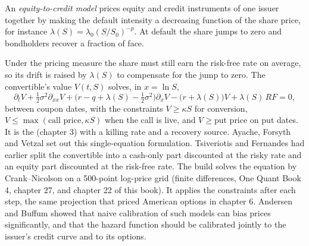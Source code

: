 \begin{definition}\label{def:dv:convertibles-and-the-credit-equity-link:e2c}
An \emph{equity-to-credit model} prices equity and credit instruments of one issuer together by making the
default intensity a decreasing function of the share price, for instance $\lambda(S)=\lambda_0(S/S_0)^{-p}$. At default the share
jumps to zero and bondholders recover a fraction of face.
\end{definition}

Under the pricing measure the share must still earn the risk-free rate on average, so its drift is raised by $\lambda(S)$ to compensate
for the jump to zero. The convertible's value $V(t,S)$ solves, in $x=\ln S$,
\[
\partial_tV+\tfrac12\sigma^2\partial_{xx}V+\bigl(r-q+\lambda(S)-\tfrac12\sigma^2\bigr)\partial_xV-\bigl(r+\lambda(S)\bigr)V+\lambda(S)\,RF=0,
\]
between coupon dates, with the constraints $V\ge\kappa S$ for conversion, $V\le\max(\text{call price},\kappa S)$ when the call is live, and
$V\ge\text{put price}$ on put dates. It is the  (chapter 3) with a killing rate and a recovery source. Ayache, Forsyth
and Vetzal set out this single-equation formulation. Tsiveriotis and Fernandes had earlier split the convertible into a cash-only part
discounted at the risky rate and an equity part discounted at the risk-free rate. The build solves the equation by Crank--Nicolson on a
500-point log-price grid (finite differences, One Quant Book 4, chapter 27, and chapter 22 of this book). It applies the constraints after
each step, the same projection that priced American options in chapter 6. Andersen and Buffum showed that naive calibration of such models
can bias prices significantly, and that the hazard function should be calibrated jointly to the issuer's credit curve and to its options.

\begin{omfigure}

\label{fig:dv:convertibles-and-the-credit-equity-link:hazard}
\end{omfigure}

